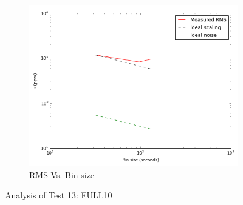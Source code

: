 \documentclass[conference]{IEEEtran}
\begin{document}
\begin{figure}[H]
    \begin{subfigure}{3}
        \includegraphics[scale=0.6]{rms_test13}
        \caption{RMS Vs. Bin size}
    \end{subfigure}
    \caption{Analysis of Test 13: FULL10}
\end{figure}
\end{document}
